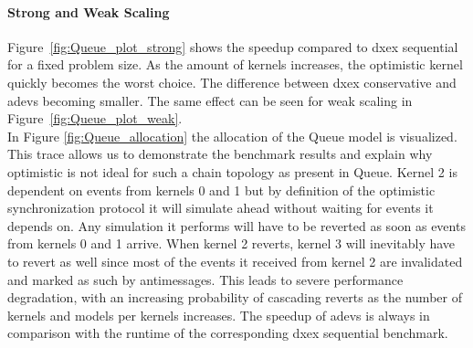 \paragraph*{Strong and Weak Scaling}
Figure~\ref{fig:Queue_plot_strong} shows the speedup compared to dxex sequential for a fixed problem size. As the amount of kernels increases, the optimistic kernel quickly becomes the worst choice. The difference between dxex conservative and adevs becoming smaller. The same effect can be seen for weak scaling in Figure~\ref{fig:Queue_plot_weak}.\\
In Figure \ref{fig:Queue_allocation} the allocation of the Queue model is visualized. This trace allows us to demonstrate the benchmark results and explain why optimistic is not ideal for such a chain topology as present in Queue. Kernel 2 is dependent on events from kernels 0 and 1 but by definition of the optimistic synchronization protocol it will simulate ahead without waiting for events it depends on. Any simulation it performs will have to be reverted as soon as events from kernels 0 and 1 arrive. When kernel 2 reverts, kernel 3 will inevitably have to revert as well since most of the events it received from kernel 2 are invalidated and marked as such by antimessages. This leads to severe performance degradation, with an increasing probability of cascading reverts as the number of kernels and models per kernels increases.
The speedup of adevs is always in comparison with the runtime of the corresponding dxex sequential benchmark.
